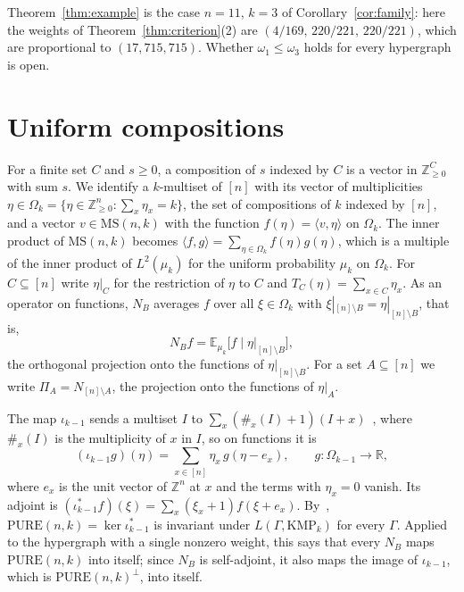 \documentclass[11pt]{amsart}
\theoremstyle{remark}
\numberwithin{equation}{section}
\newcommand{\R}{\mathbb R}
\newcommand{\Z}{\mathbb Z}
\newcommand{\PURE}{\mathrm{PURE}}
\newcommand{\MS}{\mathrm{MS}}
\newcommand{\KMP}{\mathrm{KMP}}
\begin{document}
Theorem~\ref{thm:example} is the case $n=11$, $k=3$ of Corollary~\ref{cor:family}: here the weights of Theorem~\ref{thm:criterion}(2) are $(4/169,\,220/221,\,220/221)$, which are proportional to $(17,715,715)$. Whether $\omega_1\le\omega_3$ holds for every hypergraph is open.



\section{Uniform compositions}\label{sec:prelim}

For a finite set $C$ and $s\ge0$, a composition of $s$ indexed by $C$ is a vector in $\Z_{\ge0}^C$ with sum $s$. We identify a $k$-multiset of $[n]$ with its vector of multiplicities $\eta\in\Omega_k=\{\eta\in\Z_{\ge0}^n:\sum_x\eta_x=k\}$, the set of compositions of $k$ indexed by $[n]$, and a vector $v\in\MS(n,k)$ with the function $f(\eta)=\langle v,\eta\rangle$ on $\Omega_k$. The inner product of $\MS(n,k)$ becomes $\langle f,g\rangle=\sum_{\eta\in\Omega_k}f(\eta)g(\eta)$, which is a multiple of the inner product of $L^2(\mu_k)$ for the uniform probability $\mu_k$ on $\Omega_k$. For $C\subseteq[n]$ write $\eta|_C$ for the restriction of $\eta$ to $C$ and $T_C(\eta)=\sum_{x\in C}\eta_x$. As an operator on functions, $N_B$ averages $f$ over all $\xi\in\Omega_k$ with $\xi|_{[n]\setminus B}=\eta|_{[n]\setminus B}$, that is,
\[
N_Bf=\mathbb E_{\mu_k}\bigl[f\mid\eta|_{[n]\setminus B}\bigr],
\]
the orthogonal projection onto the functions of $\eta|_{[n]\setminus B}$. For a set $A\subseteq[n]$ we write $\Pi_A=N_{[n]\setminus A}$, the projection onto the functions of $\eta|_A$.

The map $\iota_{k-1}$ sends a multiset $I$ to $\sum_x(\#_x(I)+1)(I+x)$~\cite[(3.5)]{AP26}, where $\#_x(I)$ is the multiplicity of $x$ in $I$, so on functions it is
\begin{equation}\label{eq:iota}
(\iota_{k-1}g)(\eta)=\sum_{x\in[n]}\eta_x\,g(\eta-e_x),\qquad g\colon\Omega_{k-1}\to\R,
\end{equation}
where $e_x$ is the unit vector of $\Z^n$ at $x$ and the terms with $\eta_x=0$ vanish. Its adjoint is $(\iota_{k-1}^*f)(\xi)=\sum_x(\xi_x+1)f(\xi+e_x)$. By~\cite[Proposition~3.13]{AP26}, $\PURE(n,k)=\ker\iota_{k-1}^*$ is invariant under $L(\Gamma,\KMP_k)$ for every $\Gamma$. Applied to the hypergraph with a single nonzero weight, this says that every $N_B$ maps $\PURE(n,k)$ into itself; since $N_B$ is self-adjoint, it also maps the image of $\iota_{k-1}$, which is $\PURE(n,k)^\perp$, into itself.
\end{document}
